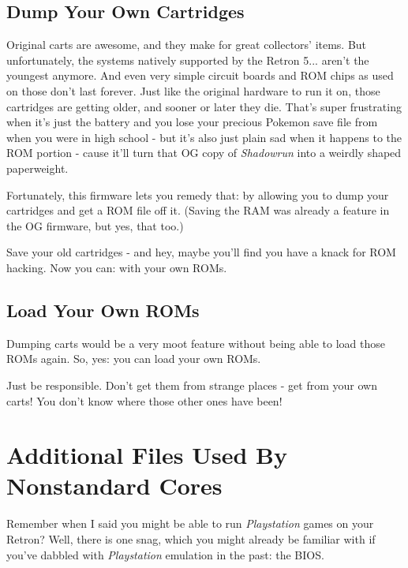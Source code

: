 \documentclass[a4paper]{article}
\begin{document}
\subsection{Dump Your Own Cartridges}

Original carts are awesome, and they make for great collectors' items. But unfortunately, the systems natively supported by the Retron 5... aren't the youngest anymore. And even very simple circuit boards and ROM chips as used on those don't last forever. Just like the original hardware to run it on, those cartridges are getting older, and sooner or later they die. That's super frustrating when it's just the battery and you lose your precious Pokemon save file from when you were in high school - but it's also just plain sad when it happens to the ROM portion - cause it'll turn that OG copy of \emph{Shadowrun} into a weirdly shaped paperweight.

Fortunately, this firmware lets you remedy that: by allowing you to dump your cartridges and get a ROM file off it. (Saving the RAM was already a feature in the OG firmware, but yes, that too.)

Save your old cartridges - and hey, maybe you'll find you have a knack for ROM hacking. Now you can: with your own ROMs.

\subsection{Load Your Own ROMs}

Dumping carts would be a very moot feature without being able to load those ROMs again. So, yes: you can load your own ROMs.

Just be responsible. Don't get them from strange places - get from your own carts! You don't know where those other ones have been!


\section{Additional Files Used By Nonstandard Cores}

Remember when I said you might be able to run \emph{Playstation} games on your Retron? Well, there is one snag, which you might already be familiar with if you've dabbled with \emph{Playstation} emulation in the past: the BIOS.
\end{document}
